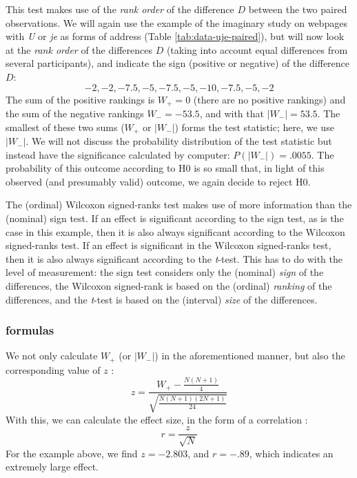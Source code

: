 \documentclass[
]{book}
\begin{document}
This test makes use of the \emph{rank order} of the difference \(D\) between
the two paired observations. We will again use the example of the imaginary
study on webpages with \emph{U} or \emph{je} as forms of
address
(Table \ref{tab:data-uje-paired}), but will now look at the \emph{rank order}
of the differences \(D\) (taking into account equal differences from several
participants), and indicate the sign (positive or
negative) of the difference \(D\):
\[-2, -2, -7.5, -5, -7.5, -5, -10, -7.5, -5, -2\]
The sum of the positive rankings is \(W_+=0\) (there are no positive rankings)
and the sum of the negative rankings \(W_-= -53.5\), and with that \(|W_-|=53.5\).
The smallest of
these two sums (\(W_+\) or \(|W_-|\)) forms the test statistic; here, we use
\(|W_-|\).
We will not discuss the probability distribution of the test statistic
but instead have the significance calculated by computer: \(P(|W_-|)=.0055\). The
probability of this outcome according to H0 is so small that, in light of this
observed (and presumably valid)
outcome, we again decide to reject H0.

The (ordinal) Wilcoxon signed-ranks test makes use of more information
than the (nominal) sign test. If an effect is significant according to the sign
test, as is the case in this example, then it is also always significant
according to the Wilcoxon signed-ranks test. If an effect is significant
in the Wilcoxon signed-ranks test, then it is also always significant according
to the \emph{t}-test. This has to do with the level of measurement: the sign test
considers only the (nominal) \emph{sign} of the differences, the
Wilcoxon signed-rank is based on the (ordinal) \emph{ranking} of the
differences, and the \emph{t}-test is based on the (interval) \emph{size} of the
differences.

\hypertarget{formulas-6}{%
\subsubsection{formulas}\label{formulas-6}}

We not only calculate \(W_+\) (or \(|W_-|\)) in the aforementioned manner, but also
the corresponding value of \(z\) \citep{Ferg89}:
\begin{equation}
  \label{eq:Wilcoxon-signedrank-z}
  z = \frac{ W_+ - \frac{N(N+1)}{4} } { \sqrt{ \frac{N(N+1)(2N+1)}{24} } }
\end{equation}
With this, we can calculate the effect size, in the form of
a correlation \citep[ Eq.2.18]{Rose91}:
\begin{equation}
  \label{eq:es-z2r}
    r = \frac {z} {\sqrt{N}}
\end{equation}
For the example above, we find
\(z=-2.803\), and \(r=-.89\), which indicates an extremely large effect.
\end{document}
